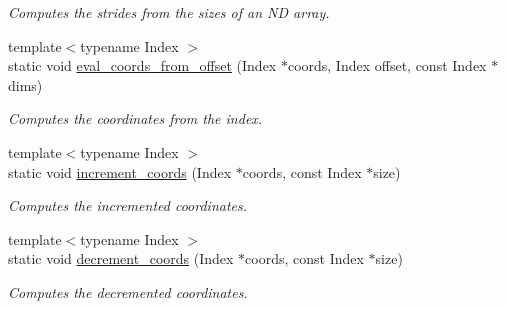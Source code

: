 \begin{DoxyCompactItemize}
\begin{DoxyCompactList}\small\item\em Computes the strides from the sizes of an N\-D array. \end{DoxyCompactList}\item 
\hypertarget{struct_d_o_1_1_offset_3_01_n_00_01_col_major_01_4_a0b52d46c505c64599af0ed217401d2fe}{{\footnotesize template$<$typename Index $>$ }\\static void \hyperlink{struct_d_o_1_1_offset_3_01_n_00_01_col_major_01_4_a0b52d46c505c64599af0ed217401d2fe}{eval\-\_\-coords\-\_\-from\-\_\-offset} (Index $\ast$coords, Index offset, const Index $\ast$dims)}\label{struct_d_o_1_1_offset_3_01_n_00_01_col_major_01_4_a0b52d46c505c64599af0ed217401d2fe}

\begin{DoxyCompactList}\small\item\em Computes the coordinates from the index. \end{DoxyCompactList}\item 
\hypertarget{struct_d_o_1_1_offset_3_01_n_00_01_col_major_01_4_acbe7b75b289ed1e202180fd94a2a707c}{{\footnotesize template$<$typename Index $>$ }\\static void \hyperlink{struct_d_o_1_1_offset_3_01_n_00_01_col_major_01_4_acbe7b75b289ed1e202180fd94a2a707c}{increment\-\_\-coords} (Index $\ast$coords, const Index $\ast$size)}\label{struct_d_o_1_1_offset_3_01_n_00_01_col_major_01_4_acbe7b75b289ed1e202180fd94a2a707c}

\begin{DoxyCompactList}\small\item\em Computes the incremented coordinates. \end{DoxyCompactList}\item 
\hypertarget{struct_d_o_1_1_offset_3_01_n_00_01_col_major_01_4_ac1c91b6ec96f5963221003a8cae3d912}{{\footnotesize template$<$typename Index $>$ }\\static void \hyperlink{struct_d_o_1_1_offset_3_01_n_00_01_col_major_01_4_ac1c91b6ec96f5963221003a8cae3d912}{decrement\-\_\-coords} (Index $\ast$coords, const Index $\ast$size)}\label{struct_d_o_1_1_offset_3_01_n_00_01_col_major_01_4_ac1c91b6ec96f5963221003a8cae3d912}

\begin{DoxyCompactList}\small\item\em Computes the decremented coordinates. \end{DoxyCompactList}\end{DoxyCompactItemize}



